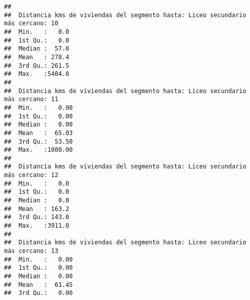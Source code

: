 \documentclass[11pt,]{article}
\begin{document}
\begin{verbatim}
##                                                                                
##  Distancia kms de viviendas del segmento hasta: Liceo secundario más cercano: 10
##  Min.   :   0.0                                                                 
##  1st Qu.:   0.0                                                                 
##  Median :  57.0                                                                 
##  Mean   : 278.4                                                                 
##  3rd Qu.: 261.5                                                                 
##  Max.   :5404.0                                                                 
##                                                                                 
##  Distancia kms de viviendas del segmento hasta: Liceo secundario más cercano: 11
##  Min.   :   0.00                                                                
##  1st Qu.:   0.00                                                                
##  Median :   0.00                                                                
##  Mean   :  65.03                                                                
##  3rd Qu.:  53.50                                                                
##  Max.   :1080.00                                                                
##                                                                                 
##  Distancia kms de viviendas del segmento hasta: Liceo secundario más cercano: 12
##  Min.   :   0.0                                                                 
##  1st Qu.:   0.0                                                                 
##  Median :   0.0                                                                 
##  Mean   : 163.2                                                                 
##  3rd Qu.: 143.0                                                                 
##  Max.   :3911.0                                                                 
##                                                                                 
##  Distancia kms de viviendas del segmento hasta: Liceo secundario más cercano: 13
##  Min.   :   0.00                                                                
##  1st Qu.:   0.00                                                                
##  Median :   0.00                                                                
##  Mean   :  61.45                                                                
##  3rd Qu.:   0.00                                                                

\end{verbatim}
\end{document}
